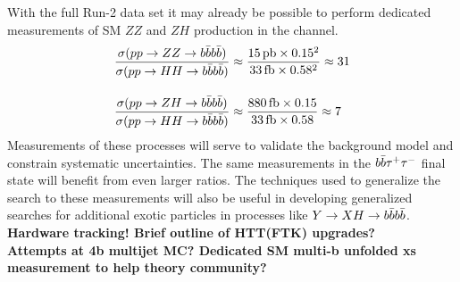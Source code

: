 With the full Run-2 data set it may already be possible to perform dedicated measurements of SM $ZZ$ and $ZH$ production in the \bbbb channel.
\begin{equation*}
  \begin{split}
    \frac{\sigma(pp\rightarrow ZZ\rightarrow b\bar{b}b\bar{b})  }{\sigma(pp\rightarrow HH\rightarrow b\bar{b}b\bar{b})  } &\approx \frac{15\,\rm{pb}\times0.15^2}{33\,\rm{fb}\times0.58^2} \approx 31 \\[10pt]
    \frac{\sigma(pp\rightarrow ZH\rightarrow b\bar{b}b\bar{b})  }{\sigma(pp\rightarrow HH\rightarrow b\bar{b}b\bar{b})  } &\approx \frac{880\,\rm{fb}\times0.15}{33\,\rm{fb}\times0.58} \approx 7
  \end{split}
\end{equation*}
Measurements of these processes will serve to validate the background model and constrain systematic uncertainties.
The same measurements in the $b\bar{b}\tau^+\tau^-$ final state will benefit from even larger ratios. 
The techniques used to generalize the \hh search to these measurements will also be useful in developing generalized \bbbb searches for additional exotic particles in processes like $Y\rightarrow XH\rightarrow b\bar{b}b\bar{b}$.
\\[20pt]
\textbf{Hardware tracking! Brief outline of HTT(FTK) upgrades?}
\\[20pt]
\textbf{Attempts at 4b multijet MC? Dedicated SM multi-b unfolded xs measurement to help theory community?}




